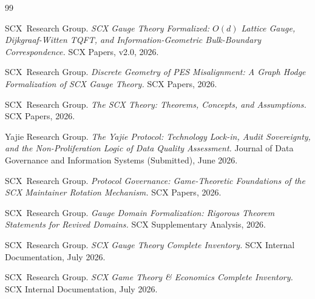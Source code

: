 \documentclass[12pt,a4paper]{article}
\theoremstyle{definition}
\theoremstyle{remark}
\theoremstyle{definition}
\newcommand{\SCX}{\textsf{SCX}}
\begin{document}
\begin{thebibliography}{99}

\SCX\ Research Group.
\emph{SCX Gauge Theory Formalized: $O(d)$ Lattice Gauge, Dijkgraaf-Witten TQFT, and Information-Geometric Bulk-Boundary Correspondence.}
SCX Papers, v2.0, 2026.

\SCX\ Research Group.
\emph{Discrete Geometry of PES Misalignment: A Graph Hodge Formalization of SCX Gauge Theory.}
SCX Papers, 2026.

\SCX\ Research Group.
\emph{The SCX Theory: Theorems, Concepts, and Assumptions.}
SCX Papers, 2026.

Yajie Research Group.
\emph{The Yajie Protocol: Technology Lock-in, Audit Sovereignty, and the Non-Proliferation Logic of Data Quality Assessment.}
Journal of Data Governance and Information Systems (Submitted), June 2026.

\SCX\ Research Group.
\emph{Protocol Governance: Game-Theoretic Foundations of the SCX Maintainer Rotation Mechanism.}
SCX Papers, 2026.

\SCX\ Research Group.
\emph{Gauge Domain Formalization: Rigorous Theorem Statements for Revived Domains.}
SCX Supplementary Analysis, 2026.

\SCX\ Research Group.
\emph{SCX Gauge Theory Complete Inventory.}
SCX Internal Documentation, July 2026.

\SCX\ Research Group.
\emph{SCX Game Theory \& Economics Complete Inventory.}
SCX Internal Documentation, July 2026.

\end{thebibliography}
\end{document}
